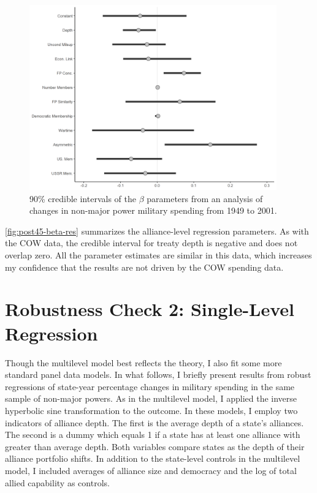 \documentclass[12pt]{article}
\begin{document}
\begin{figure}[htbp]
	\centering
		\includegraphics[width=0.95\textwidth]{post45-beta-res.png}
	\caption{90\% credible intervals of the $\beta$ parameters from an analysis of changes in non-major power military spending from 1949 to 2001.}
	\label{fig:post45-beta-res}
\end{figure}


\autoref{fig:post45-beta-res} summarizes the alliance-level regression parameters. 
As with the COW data, the credible interval for treaty depth is negative and does not overlap zero. 
All the parameter estimates are similar in this data, which increases my confidence that the results are not driven by the COW spending data. 

 


\section*{Robustness Check 2: Single-Level Regression}

Though the multilevel model best reflects the theory, I also fit some more standard panel data models. 
In what follows, I briefly present results from robust regressions of state-year percentage changes in military spending in the same sample of non-major powers. 
As in the multilevel model, I applied the inverse hyperbolic sine transformation to the outcome. 
In these models, I employ two indicators of alliance depth. 
The first is the average depth of a state's alliances. 
The second is a dummy which equals 1 if a state has at least one alliance with greater than average depth. 
Both variables compare states as the depth of their alliance portfolio shifts. 
In addition to the state-level controls in the multilevel model, I included averages of alliance size and democracy and the log of total allied capability as controls. 
\end{document}
